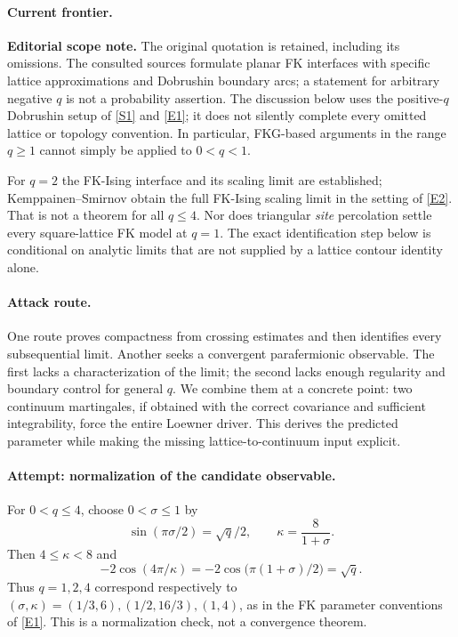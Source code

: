 \documentclass[11pt,a4paper]{article}
\newcommand{\sref}[2]{\hyperlink{source:#1:#2}{[S#2]}}
\newcommand{\eref}[2]{\hyperlink{extra:#1:#2}{[E#2]}}
\numberwithin{equation}{section}
\begin{document}
\paragraph{Current frontier.}
\textbf{Editorial scope note.} The original quotation is retained, including
its omissions. The consulted sources formulate planar FK interfaces with
specific lattice approximations and Dobrushin boundary arcs; a statement
for arbitrary negative $q$ is not a probability assertion. The discussion
below uses the positive-$q$ Dobrushin setup of \sref{statement}{1} and
\eref{statement}{1}; it does not silently complete every omitted lattice or
topology convention. In particular, FKG-based arguments in the range
$q\ge1$ cannot simply be applied to $0<q<1$.

For $q=2$ the FK-Ising interface and its scaling limit are established;
Kemppainen--Smirnov obtain the full FK-Ising scaling limit in the setting of
\eref{statement}{2}. That is not a theorem for all $q\le4$. Nor does triangular
\emph{site} percolation settle every square-lattice FK model at $q=1$.
The exact identification step below is conditional on analytic limits that
are not supplied by a lattice contour identity alone.

\paragraph{Attack route.}
One route proves compactness from crossing estimates and then identifies
every subsequential limit. Another seeks a convergent parafermionic
observable. The first lacks a characterization of the limit; the second
lacks enough regularity and boundary control for general $q$. We combine
them at a concrete point: two continuum martingales, if obtained with the
correct covariance and sufficient integrability, force the entire Loewner
driver. This derives the predicted parameter while making the missing
lattice-to-continuum input explicit.

\paragraph{Attempt: normalization of the candidate observable.}
For $0<q\le4$, choose $0<\sigma\le1$ by
\[
 \sin(\pi\sigma/2)=\sqrt q/2,
 \qquad \kappa=\frac8{1+\sigma}.
\]
Then $4\le\kappa<8$ and
\[
 -2\cos(4\pi/\kappa)
   =-2\cos\bigl(\pi(1+\sigma)/2\bigr)=\sqrt q.
\]
Thus $q=1,2,4$ correspond respectively to
$(\sigma,\kappa)=(1/3,6),(1/2,16/3),(1,4)$, as in the FK parameter
conventions of \eref{statement}{1}. This is a normalization check, not a
convergence theorem.
\end{document}
